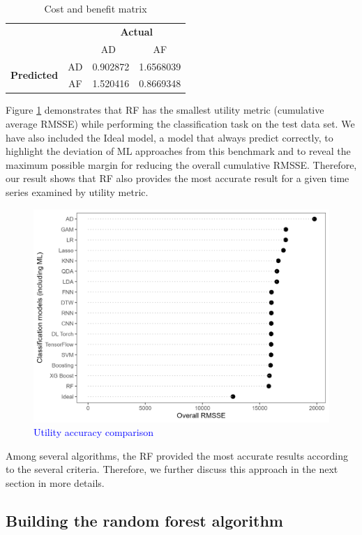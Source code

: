 \documentclass[preprint, 3p,
authoryear]{elsarticle} %
\begin{document}
\begin{table}
\caption{\label{tab:matrix}Cost and benefit matrix}
\centering
\begin{tabular}[t]{lccc}

\multicolumn{2}{c}{} & \multicolumn{2}{c}{\bf Actual}\\ 
\cline{3-4}
& & AD\  & AF\\
\hline
\multirow{2}{4em}{\bf Predicted} & AD & 0.902872 & 1.6568039\\
& AF & 1.520416 & 0.8669348\\
\hline
\end{tabular}
\end{table}

Figure \ref{fig:tableCB} demonstrates that RF has the smallest utility
metric (cumulative average RMSSE) while performing the classification
task on the test data set. We have also included the Ideal model, a
model that always predict correctly, to highlight the deviation of ML
approaches from this benchmark and to reveal the maximum possible margin
for reducing the overall cumulative RMSSE. Therefore, our result shows
that RF also provides the most accurate result for a given time series
examined by utility metric.

\begin{figure}[H]

{\centering \includegraphics[width=0.6\linewidth]{img/utility} 

}

\caption{ \textcolor{blue}{Utility accuracy comparison} }\label{fig:tableCB}
\end{figure}

Among several algorithms, the RF provided the most accurate results
according to the several criteria. Therefore, we further discuss this
approach in the next section in more details.

\hypertarget{building-the-random-forest-algorithm}{%
\subsection{Building the random forest
algorithm}\label{building-the-random-forest-algorithm}}
\end{document}
